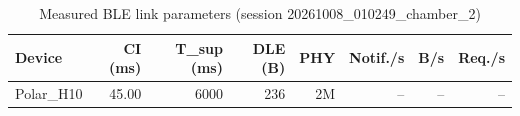 \begin{table}[t]
\caption{Measured BLE link parameters (session 20261008_010249_chamber_2)}
\label{tab:link-params}
\centering
\scriptsize
\setlength{\tabcolsep}{3pt}
\begin{tabular}{lrrrrrrr}
\toprule
\textbf{Device} & \textbf{CI (ms)} & \textbf{T_sup (ms)} & \textbf{DLE (B)} & \textbf{PHY} & \textbf{Notif./s} & \textbf{B/s} & \textbf{Req./s} \\
\midrule
Polar\_H10 & 45.00 & 6000 & 236 & 2M & -- & -- & -- \\
\bottomrule
\end{tabular}
\end{table}
